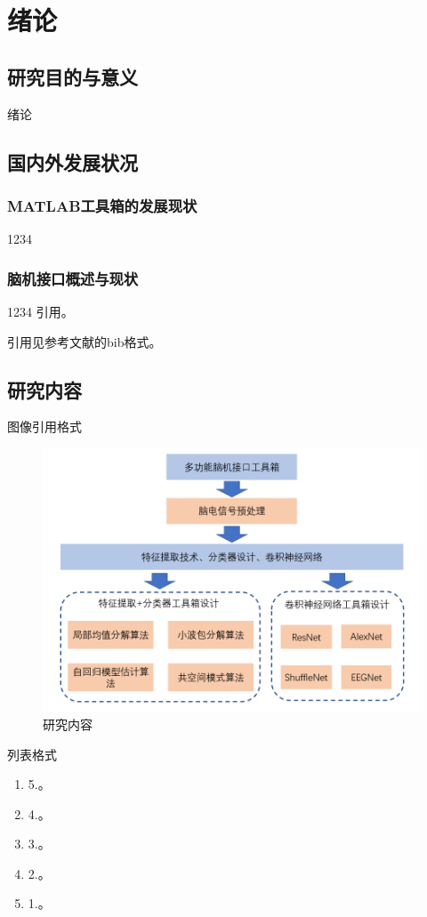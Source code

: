 \renewcommand{\baselinestretch}{1.345}
\fontsize{12pt}{14.4pt}\selectfont
\chapter{绪论}
\section{研究目的与意义}
绪论
\section{国内外发展状况}
\subsection{MATLAB工具箱的发展现状}

1234
\subsection{脑机接口概述与现状}
1234 引用。

引用见参考文献的bib格式。

\section{研究内容}

图像引用格式
\begin{figure}[ht]
	\centering
	\includegraphics[scale=0.65]{figures/研究内容.png}
	\caption{
		研究内容
	}
	\label{研究内容}
\end{figure}
列表格式
\begin{enumerate}
\item 5.。
\item 4.。
\item 3.。
\item 2.。
\item 1.。
\end{enumerate}

\endinput
